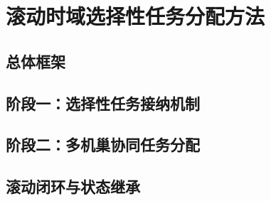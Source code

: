 %

\section{滚动时域选择性任务分配方法}

\subsection{总体框架}

\placeholder{}

\subsection{阶段一：选择性任务接纳机制}

\placeholder{}

\subsection{阶段二：多机巢协同任务分配}


\subsection{滚动闭环与状态继承}

\placeholder{}
